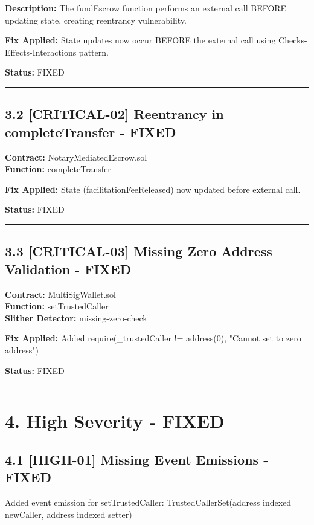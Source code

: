 \documentclass[12pt,a4paper]{article}
\begin{document}
\bigskip
\textbf{Description:} The fundEscrow function performs an external call BEFORE updating state, creating reentrancy vulnerability.

\bigskip
\textbf{Fix Applied:} State updates now occur BEFORE the external call using Checks-Effects-Interactions pattern.

\bigskip
\textbf{Status:} FIXED

\bigskip
\hrule

\subsection*{3.2 [CRITICAL-02] Reentrancy in completeTransfer - FIXED}

\textbf{Contract:} NotaryMediatedEscrow.sol \\
\textbf{Function:} completeTransfer

\bigskip
\textbf{Fix Applied:} State (facilitationFeeReleased) now updated before external call.

\bigskip
\textbf{Status:} FIXED

\bigskip
\hrule

\subsection*{3.3 [CRITICAL-03] Missing Zero Address Validation - FIXED}

\textbf{Contract:} MultiSigWallet.sol \\
\textbf{Function:} setTrustedCaller \\
\textbf{Slither Detector:} missing-zero-check

\bigskip
\textbf{Fix Applied:} Added require(\_trustedCaller != address(0), "Cannot set to zero address")

\bigskip
\textbf{Status:} FIXED

\bigskip
\hrule

\section*{4. High Severity - FIXED}

\subsection*{4.1 [HIGH-01] Missing Event Emissions - FIXED}

Added event emission for setTrustedCaller: TrustedCallerSet(address indexed newCaller, address indexed setter)
\end{document}
